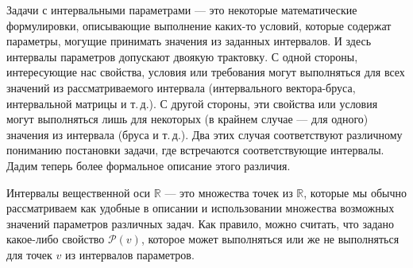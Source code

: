 \documentclass[a5paper,openany]{book}
\newcommand{\mbb}{\mathbb}
\newcommand{\mcl}{\mathcal}
\begin{document}
Задачи с интервальными параметрами --- это некоторые математические формулировки, 
описывающие выполнение каких-то условий, которые содержат параметры, могущие принимать 
значения из заданных интервалов. И здесь интервалы параметров допускают двоякую 
трактовку. С одной стороны, интересующие нас свойства, условия или требования могут 
выполняться для всех значений из рассматриваемого интервала (интервального вектора-бруса, 
интервальной матрицы и т.\,д.). С другой стороны, эти свойства или условия могут 
выполняться лишь для некоторых (в крайнем случае --- для одного) значения из интервала 
(бруса и т.\,д.). Два этих случая соответствуют различному пониманию постановки 
задачи, где встречаются соответствующие интервалы. Дадим теперь более формальное 
описание этого различия. 
  
Интервалы вещественной оси $\mbb{R}$ --- это множества точек из $\mbb{R}$, которые 
мы обычно рассматриваем как удобные в описании и использовании множества возможных 
значений параметров различных задач. Как правило, можно считать, что задано какое-либо 
свойство $\mcl{P}(v)$, которое может выполняться или же не выполняться для точек $v$ 
из интервалов параметров. 
  
\end{document}
